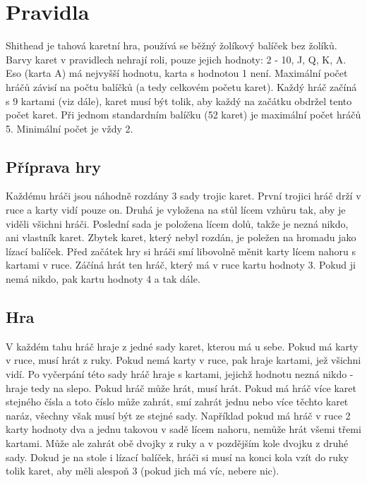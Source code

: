 
\section{Pravidla}
Shithead je tahová karetní hra, používá se běžný žolíkový balíček bez žolíků. Barvy karet v pravidlech nehrají roli, pouze jejich hodnoty: 2 - 10, J, Q, K, A. Eso (karta A) má nejvyšší hodnotu, karta s hodnotou 1 není. Maximální počet hráčů závisí na počtu balíčků (a tedy celkovém početu karet). Každý hráč začíná s 9 kartami (viz dále), karet musí být tolik, aby každý na začátku obdržel tento počet karet. Při jednom standardním balíčku (52 karet) je maximální počet hráčů 5. Minimální počet je vždy 2.

\subsection{Příprava hry}
Každému hráči jsou náhodně rozdány 3 sady trojic karet. První trojici hráč drží v ruce a karty vidí pouze on. Druhá je vyložena na stůl lícem vzhůru tak, aby je viděli všichni hráči. Poslední sada je položena lícem dolů, takže je nezná nikdo, ani vlastník karet. Zbytek karet, který nebyl rozdán, je poležen na hromadu jako lízací balíček. Před začátek hry si hráči smí libovolně měnit karty lícem nahoru s kartami v ruce. Záčíná hrát ten hráč, který má v ruce kartu hodnoty 3. Pokud ji nemá nikdo, pak kartu hodnoty 4 a tak dále.

\subsection{Hra}
V každém tahu hráč hraje z jedné sady karet, kterou má u sebe. Pokud má karty v ruce, musí hrát z ruky. Pokud nemá karty v ruce, pak hraje kartami, jež všichni vidí. Po vyčerpání této sady hráč hraje s kartami, jejichž hodnotu nezná nikdo - hraje tedy na slepo. Pokud hráč může hrát, musí hrát. Pokud má hráč více karet stejného čísla a toto číslo může zahrát, smí zahrát jednu nebo více těchto karet naráz, všechny však musí být ze stejné sady. Například pokud má hráč v ruce 2 karty hodnoty dva a jednu takovou v sadě lícem nahoru, nemůže hrát všemi třemi kartami. Může ale zahrát obě dvojky z ruky a v pozdějším kole dvojku z druhé sady. Dokud je na stole i lízací balíček, hráči si musí na konci kola vzít do ruky tolik karet, aby měli alespoň 3 (pokud jich má víc, nebere nic).

